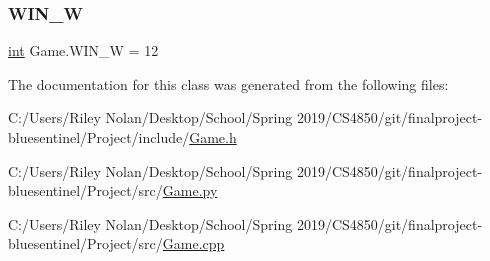 \subsubsection{\texorpdfstring{WIN\_W}{WIN\_W}}
{\footnotesize\ttfamily \mbox{\hyperlink{warnings_8h_a74f207b5aa4ba51c3a2ad59b219a423b}{int}} Game.\+W\+I\+N\+\_\+W = 12}



The documentation for this class was generated from the following files\+:\begin{DoxyCompactItemize}
\item 
C\+:/\+Users/\+Riley Nolan/\+Desktop/\+School/\+Spring 2019/\+C\+S4850/git/finalproject-\/bluesentinel/\+Project/include/\mbox{\hyperlink{_game_8h}{Game.\+h}}\item 
C\+:/\+Users/\+Riley Nolan/\+Desktop/\+School/\+Spring 2019/\+C\+S4850/git/finalproject-\/bluesentinel/\+Project/src/\mbox{\hyperlink{_game_8py}{Game.\+py}}\item 
C\+:/\+Users/\+Riley Nolan/\+Desktop/\+School/\+Spring 2019/\+C\+S4850/git/finalproject-\/bluesentinel/\+Project/src/\mbox{\hyperlink{_game_8cpp}{Game.\+cpp}}\end{DoxyCompactItemize}
